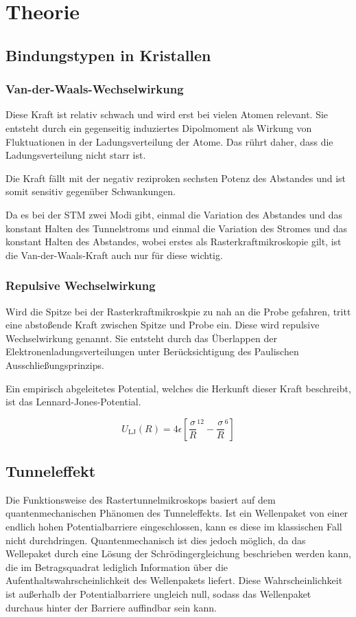 \section{Theorie}
\subsection{Bindungstypen in Kristallen}
\subsubsection{Van-der-Waals-Wechselwirkung}
Diese Kraft ist relativ schwach und wird erst bei vielen Atomen relevant. Sie entsteht durch ein gegenseitig induziertes Dipolmoment als Wirkung von Fluktuationen in der Ladungsverteilung der Atome. Das rührt daher, dass die Ladungsverteilung nicht starr ist.

\noindent Die Kraft fällt mit der negativ reziproken sechsten Potenz des Abstandes und ist somit sensitiv gegenüber Schwankungen.

\noindent Da es bei der STM zwei Modi gibt, einmal die Variation des Abstandes und das konstant Halten des Tunnelstroms und einmal die Variation des Stromes und das konstant Halten des Abstandes, wobei erstes als Rasterkraftmikroskopie gilt, ist die Van-der-Waals-Kraft auch nur für diese wichtig.

\subsubsection{Repulsive Wechselwirkung}
Wird die Spitze bei der Rasterkraftmikroskpie zu nah an die Probe gefahren, tritt eine abstoßende Kraft zwischen Spitze und Probe ein. Diese wird repulsive Wechselwirkung genannt. Sie entsteht durch das Überlappen der Elektronenladungsverteilungen unter Berücksichtigung des Paulischen Ausschließungsprinzips.

\noindent Ein empirisch abgeleitetes Potential, welches die Herkunft dieser Kraft beschreibt, ist das Lennard-Jones-Potential.

\begin{equation}
U_\text{LJ}(R)=4\epsilon\left[\frac{\sigma}{R}^12-\frac{\sigma}{R}^6\right]
\end{equation}

\subsection{Tunneleffekt}
Die Funktionsweise des Rastertunnelmikroskops basiert auf dem quantenmechanischen Phänomen des Tunneleffekts. Ist ein Wellenpaket von einer endlich hohen Potentialbarriere eingeschlossen, kann es diese im klassischen Fall nicht durchdringen. Quantenmechanisch ist dies jedoch möglich, da das Wellepaket durch eine Lösung der Schrödingergleichung beschrieben werden kann, die im Betragsquadrat lediglich Information über die Aufenthaltswahrscheinlichkeit des Wellenpakets liefert. Diese Wahrscheinlichkeit ist außerhalb der Potentialbarriere ungleich null, sodass das Wellenpaket durchaus hinter der Barriere auffindbar sein kann. 

